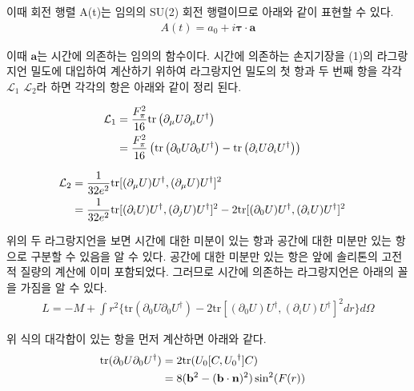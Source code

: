 \documentclass[superscriptaddress,
nofootinbib,byrevtex,fleqn,prd,12pt]{revtex4}
\newcommand{\tr}{\mathrm{tr}}
\begin{document}
이때 회전 행렬 A(t)는 임의의 SU(2) 회전 행렬이므로 아래와 같이 표현할 수 있다.
\begin{align}
  A(t)= a_{0} + i \bm{\tau} \cdot \mathbf{a}
\end{align}

이때 $ \mathbf{a} $는 시간에 의존하는 임의의 함수이다.
시간에 의존하는 손지기장을 (1)의 라그랑지언 밀도에 대입하여 계산하기 위하여 라그랑지언 밀도의 첫 항과 두 번째 항을 각각 $ \mathcal{L}_{1} $ $ \mathcal{L}_{2} $라 하면 각각의 항은 아래와 같이 정리 된다.

\begin{align}
  \mathcal{L}_{1} &= \frac{F_{\pi}^{2}}{16} \tr \left(\partial_{\mu} U \partial_{\mu} U ^{\dagger} \right) \cr
  &= \frac{F_{\pi}^{2}}{16} \left( \tr \left(\partial_{0} U \partial_{0} U ^{\dagger}\right) - \tr  \left(\partial_{i} U \partial_{i} U^{\dagger} \right)\right)
\end{align}

\begin{align}
    \mathcal{L}_{2} &=\frac{1}{32e^{2}} \tr[(\partial _{\mu}U)U^{\dagger},(\partial _{\mu}U)U^{\dagger}]^{2} \cr
    &= \frac{1}{32e^{2}} \tr[(\partial _{i}U)U^{\dagger},(\partial _{j}U)U^{\dagger}]^{2}
    -2 \tr[(\partial _{0}U)U^{\dagger},(\partial _{i}U)U^{\dagger}]^{2}
\end{align}

위의 두 라그랑지언을 보면 시간에 대한 미분이 있는 항과 공간에 대한 미분만 있는 항으로 구분할 수 있음을 알 수 있다. 공간에 대한 미분만 있는 항은 앞에 솔리톤의 고전적 질량의 계산에 이미 포함되었다. 그러므로 시간에 의존하는 라그랑지언은 아래의 꼴을 가짐을 알 수 있다.
\begin{align}
  L = - M +\int r^{2} \{ \tr (\partial_{0}U \partial_{0} U ^{\dagger}) - 2 \tr[(\partial_{0}U)U^{\dagger},(\partial_{i}U)U^{\dagger}]^{2} dr \} d\Omega
\end{align}

위 식의 대각합이 있는 항을 먼저 계산하면 아래와 같다.
\begin{align}
  \tr (\partial_{0}U \partial_{0} U ^{\dagger}) &= 2 \tr(U_{0}[C,U_0{}^{\dagger}]C) \cr
  &= 8(\mathbf{b}^{2}-(\mathbf{b} \cdot \mathbf{n})^{2})\sin^{2}(F(r))
\end{align}
\end{document}
